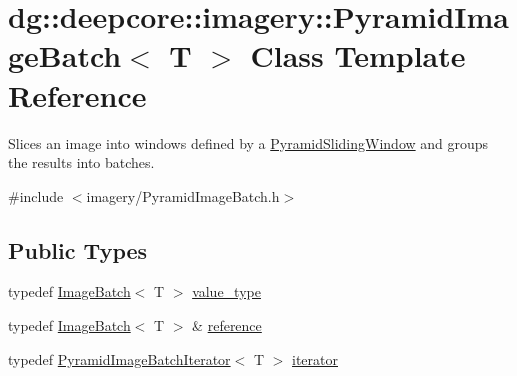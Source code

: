 \hypertarget{classdg_1_1deepcore_1_1imagery_1_1_pyramid_image_batch}{}\section{dg\+:\+:deepcore\+:\+:imagery\+:\+:Pyramid\+Image\+Batch$<$ T $>$ Class Template Reference}
\label{classdg_1_1deepcore_1_1imagery_1_1_pyramid_image_batch}


Slices an image into windows defined by a \hyperlink{classdg_1_1deepcore_1_1imagery_1_1_pyramid_sliding_window}{Pyramid\+Sliding\+Window} and groups the results into batches.  




{\ttfamily \#include $<$imagery/\+Pyramid\+Image\+Batch.\+h$>$}

\subsection*{Public Types}
\begin{DoxyCompactItemize}
\item 
typedef \hyperlink{classdg_1_1deepcore_1_1imagery_1_1_image_batch}{Image\+Batch}$<$ T $>$ \hyperlink{classdg_1_1deepcore_1_1imagery_1_1_pyramid_image_batch_a64329b050ba9864aec3e3532c7a2aad3}{value\+\_\+type}
\item 
typedef \hyperlink{classdg_1_1deepcore_1_1imagery_1_1_image_batch}{Image\+Batch}$<$ T $>$ \& \hyperlink{classdg_1_1deepcore_1_1imagery_1_1_pyramid_image_batch_ac40a046993c4d0ccdc5a44659b130c68}{reference}
\item 
typedef \hyperlink{classdg_1_1deepcore_1_1imagery_1_1_pyramid_image_batch_iterator}{Pyramid\+Image\+Batch\+Iterator}$<$ T $>$ \hyperlink{classdg_1_1deepcore_1_1imagery_1_1_pyramid_image_batch_a4cad1aac53a144da29324e48ea357f78}{iterator}
\end{DoxyCompactItemize}
